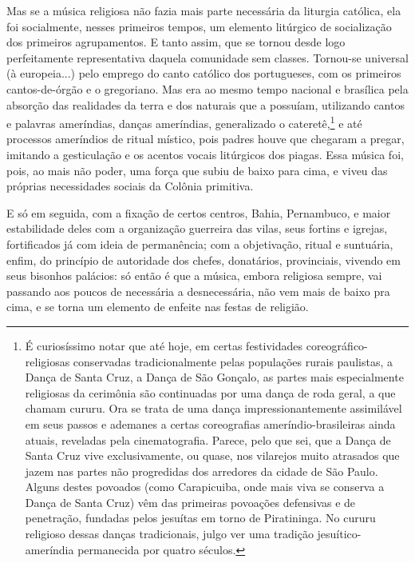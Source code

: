 Mas se a música religiosa não fazia mais parte necessária da liturgia
católica, ela foi socialmente, nesses primeiros tempos, um elemento
litúrgico de socialização dos primeiros agrupamentos. E tanto assim, que
se tornou desde logo perfeitamente representativa daquela comunidade sem
classes. Tornou-se universal (à europeia...) pelo emprego do canto
católico dos portugueses, com os primeiros cantos-de-órgão e o
gregoriano. Mas era ao mesmo tempo nacional e brasílica pela absorção
das realidades da terra e dos naturais que a possuíam, utilizando cantos
e palavras ameríndias, danças ameríndias, generalizado o cateretê,\footnote{É curiosíssimo notar que até hoje, em certas festividades
  coreográfico-religiosas conservadas tradicionalmente pelas populações
  rurais paulistas, a Dança de Santa Cruz, a Dança de São Gonçalo, as
  partes mais especialmente religiosas da cerimônia são continuadas por
  uma dança de roda geral, a que chamam cururu. Ora se trata de uma
  dança impressionantemente assimilável em seus passos e ademanes a
  certas coreografias ameríndio-brasileiras ainda atuais, reveladas pela
  cinematografia. Parece, pelo que sei, que a Dança de Santa Cruz vive
  exclusivamente, ou quase, nos vilarejos muito atrasados que jazem nas
  partes não progredidas dos arredores da cidade de São Paulo. Alguns
  destes povoados (como Carapicuiba, onde mais viva se conserva a Dança
  de Santa Cruz) vêm das primeiras povoações defensivas e de penetração,
  fundadas pelos jesuítas em torno de Piratininga. No cururu religioso
  dessas danças tradicionais, julgo ver uma tradição jesuítico-ameríndia
  permanecida por quatro séculos.} e
até processos ameríndios de ritual místico, pois padres houve que
chegaram a pregar, imitando a gesticulação e os acentos vocais
litúrgicos dos piagas. Essa música foi, pois, ao mais não poder, uma
força que subiu de baixo para cima, e viveu das próprias necessidades
sociais da Colônia primitiva.

E só em seguida, com a fixação de certos centros, Bahia, Pernambuco, e
maior estabilidade deles com a organização guerreira das vilas, seus
fortins e igrejas, fortificados já com ideia de permanência; com a
objetivação, ritual e suntuária, enfim, do princípio de autoridade dos
chefes, donatários, provinciais, vivendo em seus bisonhos palácios: só
então é que a música, embora religiosa sempre, vai passando aos poucos
de necessária a desnecessária, não vem mais de baixo pra cima, e se
torna um elemento de enfeite nas festas de religião.

